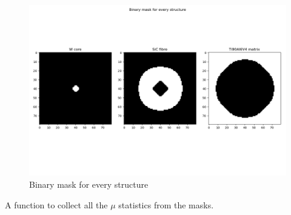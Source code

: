 \documentclass[11pt]{article}
\begin{document}
    \begin{figure}
\centering
\includegraphics{plots/masks.png}
\caption{Binary mask for every structure}
\end{figure}

A function to collect all the \(\mu\) statistics from the masks.
\end{document}

